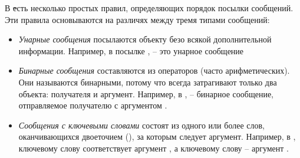 \documentclass[a4paper,10pt,twoside]{book}
\begin{document}
В \st есть несколько простых правил, определяющих порядок посылки сообщений. Эти правила основываются на различях между тремя типами сообщений:
\begin{itemize}
\item \emph{Унарные сообщения} посылаются объекту безо всякой дополнительной информации. Например, в посылке ,  -- это унарное сообщение
\item  \emph{Бинарные сообщения} составляются из операторов (часто арифметических). Они называются бинарными, потому что всегда затрагивают только два объекта: получателя и аргумент. Например, в ,  \ct{+} -- бинарное сообщение, отправляемое получателю  с аргументом .
\item  \emph{Сообщения с ключевыми словами} состоят из одного или более слов, оканчивающихся двоеточием (\ct{:}), за которым следует аргумент.
Например, в , ключевому слову  соответствует аргумент , а ключевому слову  -- аргумент .
\end{itemize}

\end{document}
